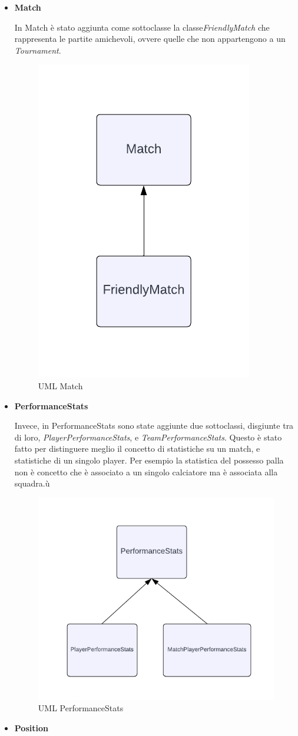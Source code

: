 \documentclass[11pt]{report} %
\begin{document}
 \begin{itemize}
     \item \textbf{Match}

     In Match è stato aggiunta come sottoclasse la  classe\textit{FriendlyMatch} che rappresenta le partite amichevoli, ovvere quelle che non appartengono a un \textit{Tournament}.
    \begin{figure}[H]
        \centering
        \includegraphics[width=0.3\linewidth]{MATCH.png}
        \caption{UML Match}
        \label{fig:enter-label}
    \end{figure}
     \item \textbf{PerformanceStats}

     Invece, in PerformanceStats sono state aggiunte due sottoclassi, disgiunte tra di loro, \textit{PlayerPerformanceStats}, e \textit{TeamPerformanceStats}. Questo è stato fatto per distinguere meglio il concetto di statistiche su un match, e statistiche di un singolo player.
     Per esempio la statistica del possesso palla non è concetto che è associato a un singolo calciatore ma è associata alla squadra.ù
     \begin{figure}[H]
         \centering
         \includegraphics[width=0.4\linewidth]{STATS.png}
         \caption{UML PerformanceStats}
         \label{fig:enter-label}
     \end{figure}
     \item \textbf{Position}


\end{itemize}
\end{document}
